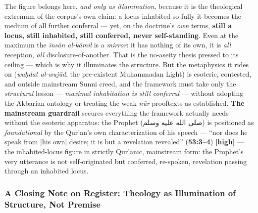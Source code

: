 \documentclass[11pt]{article}
\newcommand{\AR}[1]{{\arabicfont\beginR #1\endR}}
\begin{document}
The figure belongs here, \emph{and only as illumination}, because it is the theological extremum of the corpus's own claim: a locus inhabited so fully it becomes the medium of all further conferral — yet, on the doctrine's \emph{own} terms, \textbf{still a locus, still inhabited, still conferred, never self-standing}. Even at the maximum the \emph{insān al-kāmil} is a \emph{mirror}: it has nothing of its own, it is \emph{all} reception, \emph{all} disclosure-of-another. That is the no-aseity thesis pressed to its ceiling — which is why it illuminates the structure. But the metaphysics it rides on (\emph{waḥdat al-wujūd}, the pre-existent Muhammadan Light) is esoteric, contested, and outside mainstream Sunni creed, and the framework must take only the \emph{structural} lesson — \emph{maximal inhabitation is still conferral} — without adopting the Akbarian ontology or treating the weak \emph{nūr} prooftexts as established. \textbf{The mainstream guardrail} secures everything the framework actually needs without the esoteric apparatus: the Prophet (\AR{صلى الله عليه وسلم}) is positioned as \emph{foundational} by the Qur'an's own characterization of his speech — ``nor does he speak from [his own] desire; it is but a revelation revealed'' (\textbf{53:3–4}) \textbf{[high]} — the inhabited-locus figure in strictly Qur'anic, mainstream form: the Prophet's very utterance is not self-originated but conferred, re-spoken, revelation passing through an inhabited locus.

\subsubsection*{A Closing Note on Register: Theology as Illumination of Structure, Not Premise}
\end{document}
